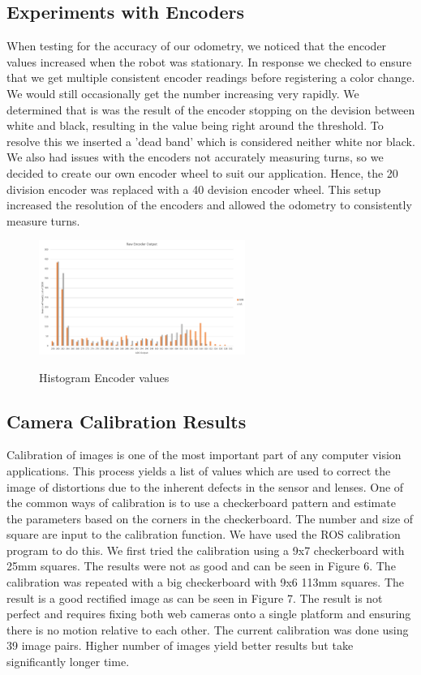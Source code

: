 \documentclass[10pt]{article}
\begin{document}
\subsection{Experiments with Encoders}
When testing for the accuracy of our odometry, we noticed that the encoder values increased when the robot was stationary. In response we checked to ensure that we get multiple consistent encoder readings before registering a color change. We would still occasionally get the number increasing very rapidly. We determined that is was the result of the encoder stopping on the devision between white and black, resulting in the value being right around the threshold. To resolve this we inserted a 'dead band' which is considered neither white nor black. We also had issues with the encoders not accurately measuring turns, so we decided to create our own encoder wheel to suit our application. Hence, the 20 division encoder was replaced with a 40 devision encoder wheel. This setup increased the resolution of the encoders and allowed the odometry to consistently measure turns.     
\begin{figure}[H]
\centering \includegraphics[width=0.6\textwidth]{EncoderValues.png}\label{Encoder values}
\caption{Histogram Encoder values}
\end{figure}


\subsection{Camera Calibration Results}
	Calibration of images is one of the most important part of any computer vision applications. This process yields a list of values which are used to correct the image of distortions due to the inherent defects in the sensor and lenses. One of the common ways of calibration is to use a checkerboard pattern and estimate the parameters based on the corners in the checkerboard. The number and size of square are input to the calibration function. We have used the ROS calibration program to do this. We first tried the calibration using a 9x7 checkerboard with 25mm squares. The results were not as good and can be seen in Figure 6. The calibration was repeated with a big checkerboard with 9x6 113mm squares. The result is a good rectified image as can be seen in Figure 7. The result is not perfect and requires fixing both web cameras onto a single platform and ensuring there is no motion relative to each other. The current calibration was done using 39 image pairs. Higher number of images yield better results but take significantly longer time.
    
\end{document}
